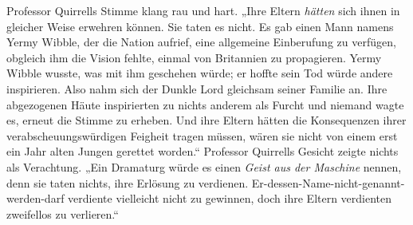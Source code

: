 Professor Quirrells Stimme klang rau und hart.
„Ihre Eltern \emph{hätten} sich ihnen in gleicher Weise erwehren können. Sie taten es nicht. Es gab einen Mann namens Yermy Wibble, der die Nation aufrief, eine allgemeine Einberufung zu verfügen, obgleich ihm die Vision fehlte, einmal von Britannien zu propagieren. Yermy Wibble wusste, was mit ihm geschehen würde; er hoffte sein Tod würde andere inspirieren. Also nahm sich der Dunkle Lord gleichsam seiner Familie an. Ihre abgezogenen Häute inspirierten zu nichts anderem als Furcht und niemand wagte es, erneut die Stimme zu erheben. Und ihre Eltern hätten die Konsequenzen ihrer verabscheuungswürdigen Feigheit tragen müssen, wären sie nicht von einem erst ein Jahr alten Jungen gerettet worden.“ Professor Quirrells Gesicht zeigte nichts als Verachtung.
„Ein Dramaturg würde es einen \emph{Geist aus der Maschine} nennen, denn sie taten nichts, ihre Erlösung zu verdienen. Er-dessen-Name-nicht-genannt-werden-darf verdiente vielleicht nicht zu gewinnen, doch ihre Eltern verdienten zweifellos zu verlieren.“

